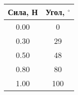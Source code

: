 \begin{tabular}{|c|c|}
\hline
Сила, Н & Угол, $^\circ$ \\ \hline
0.00 & 0 \\ \hline
0.30 & 29 \\ \hline
0.50 & 48 \\ \hline
0.80 & 80 \\ \hline
1.00 & 100 \\ \hline
\end{tabular}
